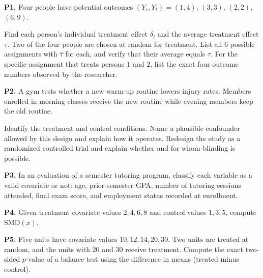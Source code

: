 \documentclass[10pt]{scrartcl}
\begin{document}
\begin{prob}
\textbf{P1.} Four people have potential outcomes $(Y_c, Y_t) = (1, 4)$, $(3, 3)$, $(2, 2)$, $(6, 9)$.
\begin{enumerate}[(a)]
  \ii Find each person's individual treatment effect $\delta_i$ and the average treatment effect $\tau$.
  \ii Two of the four people are chosen at random for treatment. List all $6$ possible assignments with $\hat\tau$ for each, and verify that their average equals $\tau$.
  \ii For the specific assignment that treats persons $1$ and $2$, list the exact four outcome numbers observed by the researcher.
\end{enumerate}
\end{prob}

\begin{prob}
\textbf{P2.} A gym tests whether a new warm-up routine lowers injury rates. Members enrolled in morning classes receive the new routine while evening members keep the old routine.
\begin{enumerate}[(a)]
  \ii Identify the treatment and control conditions.
  \ii Name a plausible confounder allowed by this design and explain how it operates.
  \ii Redesign the study as a randomized controlled trial and explain whether and for whom blinding is possible.
\end{enumerate}
\end{prob}

\begin{prob}
\textbf{P3.} In an evaluation of a semester tutoring program, classify each variable as a valid covariate or not: age, prior-semester GPA, number of tutoring sessions attended, final exam score, and employment status recorded at enrollment.
\end{prob}

\begin{prob}
\textbf{P4.} Given treatment covariate values $2, 4, 6, 8$ and control values $1, 3, 5$, compute $\mathrm{SMD}(x)$.
\end{prob}

\begin{prob}
\textbf{P5.} Five units have covariate values $10, 12, 14, 20, 30$. Two units are treated at random, and the units with $20$ and $30$ receive treatment. Compute the exact two-sided $p$-value of a balance test using the difference in means (treated minus control).
\end{prob}
\end{document}
